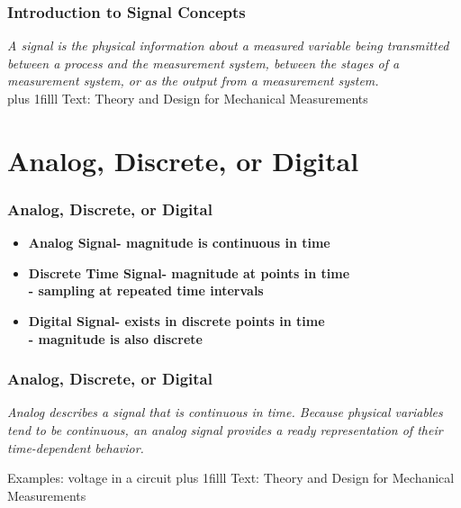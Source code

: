 \documentclass[fleqn]{beamer} %
\newcommand{\sectiontitleI}{Introduction to Signal Concepts}
\newcommand{\sectiontitleII}{Analog, Discrete, or Digital}
\newcommand{\btVFill}{\vskip0pt plus 1filll}
\begin{document}
	\begin{frame}[label=sectionI] \small
		\frametitle{\sectiontitleI}    				
		\bigskip
		
		{\it A {\PR signal} is the physical information about a measured variable being transmitted
		between a process and the measurement system, between the stages of a measurement system, or as
		the output from a measurement system. } \\
	
		
		\btVFill
		\tiny{Text: Theory and Design for Mechanical Measurements}	
	\end{frame}


\section{\sectiontitleII}	
	\begin{frame}[label=sectionII] \small
		\frametitle{\sectiontitleII}
		

	    \begin{itemize}
			\item \textbf{Analog Signal- magnitude is continuous in time }  \vspace{3mm} \\
			\item \textbf{Discrete Time Signal- magnitude at points in time}  \vspace{3mm} \\
			\textbf{ \hspace*{15mm} - sampling at repeated time intervals}  \vspace{3mm} \\
			\item \textbf{Digital Signal- exists in discrete points in time}  \vspace{3mm} \\
			\textbf{ \hspace*{15mm} - magnitude is also discrete}  \vspace{3mm} \\
		\end{itemize}
		
		
	\end{frame}

	\begin{frame} \small
		\frametitle{\sectiontitleII}
		\bigskip    
		
		{\it {\RD Analog} describes a signal that is
		continuous in time. Because physical variables tend to be continuous, an analog signal provides a
		ready representation of their time-dependent behavior. }

		\vspace{30mm}
		Examples: voltage in a circuit
		\btVFill
		\tiny{Text: Theory and Design for Mechanical Measurements}	
	\end{frame}
	
\end{document}
